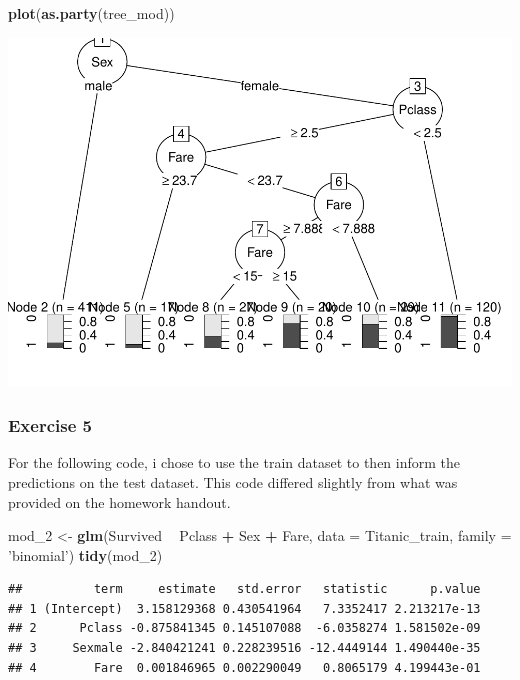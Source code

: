 \documentclass[]{article}
\newenvironment{Shaded}{\begin{snugshade}}{\end{snugshade}}
\newcommand{\KeywordTok}[1]{\textcolor[rgb]{0.13,0.29,0.53}{\textbf{#1}}}
\newcommand{\DataTypeTok}[1]{\textcolor[rgb]{0.13,0.29,0.53}{#1}}
\newcommand{\DecValTok}[1]{\textcolor[rgb]{0.00,0.00,0.81}{#1}}
\newcommand{\StringTok}[1]{\textcolor[rgb]{0.31,0.60,0.02}{#1}}
\newcommand{\OperatorTok}[1]{\textcolor[rgb]{0.81,0.36,0.00}{\textbf{#1}}}
\newcommand{\NormalTok}[1]{#1}
\begin{document}
\begin{Shaded}
\begin{Highlighting}[]
\KeywordTok{plot}\NormalTok{(}\KeywordTok{as.party}\NormalTok{(tree_mod))}
\end{Highlighting}
\end{Shaded}

\includegraphics{homework_8_Hee_Bryan_files/figure-latex/unnamed-chunk-3-1.pdf}

\subsubsection{Exercise 5}\label{exercise-5}

For the following code, i chose to use the train dataset to then inform
the predictions on the test dataset. This code differed slightly from
what was provided on the homework handout.

\begin{Shaded}
\begin{Highlighting}[]
\NormalTok{mod_}\DecValTok{2}\NormalTok{ <-}\StringTok{ }\KeywordTok{glm}\NormalTok{(Survived }\OperatorTok{~}\StringTok{ }\NormalTok{Pclass }\OperatorTok{+}\StringTok{ }\NormalTok{Sex }\OperatorTok{+}\StringTok{ }\NormalTok{Fare, }\DataTypeTok{data =}\NormalTok{ Titanic_train, }\DataTypeTok{family =} \StringTok{'binomial'}\NormalTok{)}
\KeywordTok{tidy}\NormalTok{(mod_}\DecValTok{2}\NormalTok{)}
\end{Highlighting}
\end{Shaded}

\begin{verbatim}
##          term     estimate   std.error   statistic      p.value
## 1 (Intercept)  3.158129368 0.430541964   7.3352417 2.213217e-13
## 2      Pclass -0.875841345 0.145107088  -6.0358274 1.581502e-09
## 3     Sexmale -2.840421241 0.228239516 -12.4449144 1.490440e-35
## 4        Fare  0.001846965 0.002290049   0.8065179 4.199443e-01
\end{verbatim}
\end{document}

